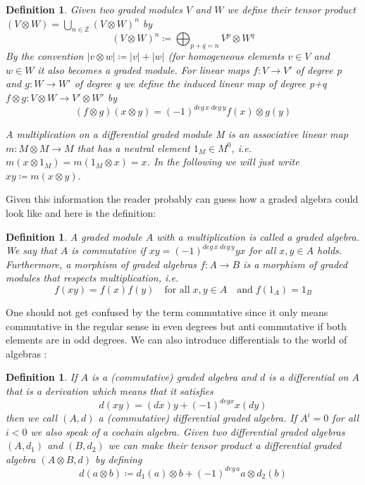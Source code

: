 \documentclass[12pt,a4paper]{scrartcl}
\newtheorem{Definition}[Theorem]{Definition}
\numberwithin{equation}{section}
\newcommand{\Z}{\mathbb{Z}} %
\begin{document}
\begin{Definition}
 Given two graded modules $V$ and $W$ we define their \emph{tensor product} \newline
 ${(V \otimes W) = \bigcup_{n \in \Z} (V \otimes W)^n }$ by 
 $$ (V \otimes W)^n \coloneqq \bigoplus_{p + q = n} V^p \otimes W^q$$
 By the convention $|v \otimes w| \coloneqq |v| + |w|$ (for homogeneous elements $v \in V$ and $w \in W$
 it also becomes a graded module. \newline
 For linear maps $f \colon V \to V'$ of degree p and $g \colon W \to W'$ of degree q we define the induced linear map
 of degree p+q \;  ${f \otimes g \colon V \otimes W \to V' \otimes W'}$ by
 $$ (f \otimes g) ( x \otimes y) = (-1)^{deg \, x \; deg \,y} f(x) \otimes g(y) $$

 A multiplication on a differential graded module M is an associative linear map \newline
 ${m \colon M \otimes M \to M }$ that has a neutral element $1_M \in M^0$, i.e. $m(x \otimes 1_M) = m(1_M \otimes x) = x$.
 In the following we will just write $xy \coloneqq m(x \otimes y)$.
 \end{Definition}

 Given this information the reader probably can guess how a graded algebra could look like and here is the definition:
\begin{Definition}
 A graded module $A$ with a multiplication is called a \emph{graded algebra}. We say that $A$ is \emph{commutative} if
 $xy = (-1)^{deg \, x \; deg \, y} yx$ for all $x,y \in A$ holds. Furthermore, a \emph{morphism of graded algebras} 
 $f \colon A \to B$ is a morphism of graded modules that respects multiplication, i.e. 
 $$f(xy) = f(x)f(y) \quad \text{for all} \; x,y \in A \quad \text{and} \; f(1_A) = 1_B $$
\end{Definition}

One should not get confused by the term commutative since it only means commutative in the regular sense in even degrees but
anti commutative if both elements are in odd degrees.
We can also introduce differentials to the world of algebras :
\begin{Definition}
 If $A$ is a (commutative) graded algebra and $d$ is a differential on $A$ that is a \emph{derivation} which means
 that it satisfies 
 $$ d(xy) = (dx)y + (-1)^{deg x} x(dy)$$
 then we call $(A,d)$ a \emph{(commutative) differential graded algebra}. If $A^i = 0$ for all $i < 0$ we also
 speak of a \emph{cochain algebra}. \newline
 Given two differential graded algebras $(A,d_1)$ and $(B, d_2)$ we can make their tensor product a 
 differential graded algebra $(A \otimes B, d)$ by defining 
 $$ d(a \otimes b) \coloneqq d_1(a) \otimes b + (-1)^{deg \, a} a \otimes d_2(b)$$
\end{Definition}
\end{document}

